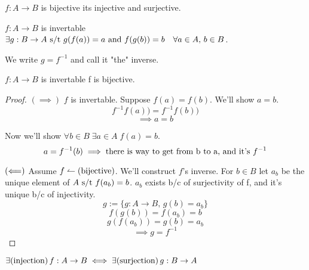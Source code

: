 \documentclass[12pt]{article}
\begin{document}
\bbox
\begin{defn}[Bijective] \label{defn:bij}
  \(f:A\to B\) is bijective  its injective and surjective.
\end{defn}
\ebox


\bbox
\begin{defn}[Invertable]
  \(f:A\to B\) is invertable  \(\exists g:B\to A\text{ s/t } g(f(a))=a\text{ and }
  f(g(b))=b\quad\forall a\in A,\,b\in B\).
\end{defn}
\ebox
We write \(g=f^{-1}\) and call it "the" inverse.


\bbox
\begin{prop}
  \(f:A\to B\) is invertable  f is bijective.
\end{prop}
\ebox

\begin{proof}
  \((\implies)\) \(f\) is invertable. Suppose \(f(a)=f(b)\). We'll show \(a=b\).
  \[f^{-1}f(a))=f^{-1}f(b))\]
  \[\implies a=b\]
  
  Now we'll show \(\forall b\in B\;\exists a\in A\;f(a)=b\).
  \[a=f^{-1}(b)\implies\text{there is way to get from b to a, and it's }f^{-1}\]

  \((\Longleftarrow)\) Assume \(f\leftharpoonup(\text{bijective})\). We'll construct \(f\)'s
  inverse. For \(b\in B\) let \(a_b\) be the unique element of \(A\text{ s/t } f(a_b)=b\).
  \(a_b\) exists b/c of surjectivity of f, and it's unique b/c of injectivity.
  \[g:=\{g:A\to B,\,g(b)=a_b\}\]
  \[f(g(b))=f(a_b)=b\]
  \[g(f(a_b))=g(b)=a_b\]
  \[\implies g=f^{-1}\]
\end{proof}

\bbox
\begin{prop}
  \(\exists(\text{injection})\,f:A\to B\iff\exists(\text{surjection})\,g:B\to A\)
\end{prop}
\ebox
\end{document}
